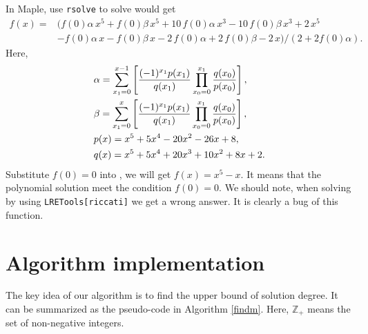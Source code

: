 \begin{example}
In Maple, use \texttt{rsolve} to solve  would get
\begin{equation}
\begin{split}
    f(x)=&(f \left( 0 \right) \alpha\,{x}^{5}+f \left( 0 \right) \beta\,{x}^{5}+10\,f \left( 0 \right) \alpha\,{x}^{3}-10\,f \left( 0 \right) \beta\,{x}^{3}+2\,{x}^{5}\\
    &-f \left( 0 \right) \alpha\,x-f \left( 0 \right) \beta\,x-2\,f \left( 0 \right) \alpha+2\,f \left( 0 \right) \beta-2\,x)/(2+2f(0)\alpha) . 
\end{split} \label{rasol_real}
\end{equation}
Here,
\begin{equation}
\begin{split}
&\alpha=\sum_{x_1=0}^{x-1}\left[
    \frac{(-1)^{x_1}p(x_1)}{q(x_1)}\prod_{x_0=0}^{x_1}{
        \frac{q(x_0)}{p(x_0)}
    }
\right], \\
&\beta=\sum_{x_1=0}^{x}\left[
    \frac{(-1)^{x_1}p(x_1)}{q(x_1)}\prod_{x_0=0}^{x_1}{
        \frac{q(x_0)}{p(x_0)}
    }
\right], \\
&p(x)=x^5+5x^4-20x^2-26x+8, \\
&q(x)=x^5+5x^4+20x^3+10x^2+8x+2. 
\end{split}
\end{equation}
Substitute $f(0)=0$ into , we will get $f(x)=x^5-x$. It means that the polynomial solution meet the condition $f(0)=0$. We should note, when solving  by using \texttt{LRETools[riccati]} we get a wrong answer. It is clearly a bug of this function.
\end{example}

\section{Algorithm implementation} \label{implementation-02}

The key idea of our algorithm is to find the upper bound of solution degree. It can be summarized as the pseudo-code in Algorithm \ref{findm}. Here, $\mathbb Z_+$ means the set of non-negative integers.

